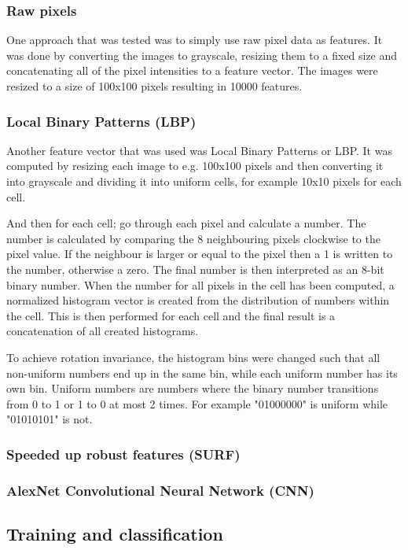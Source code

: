 \documentclass[doc/report.tex]{subfiles}
\begin{document}
\subsubsection{Raw pixels}
One approach that was tested was to simply use raw pixel data as features. It
was done by converting the images to grayscale, resizing them to a fixed size
and concatenating all of the pixel intensities to a feature vector. The images
were resized to a size of 100x100 pixels resulting in 10000 features.

\subsubsection{Local Binary Patterns (LBP)}
Another feature vector that was used was Local Binary Patterns or LBP. It was
computed by resizing each image to e.g. 100x100 pixels and then converting it
into grayscale and dividing it into uniform cells, for example 10x10 pixels for
each cell.

And then for each cell; go through each pixel and calculate a number. The
number is calculated by comparing the 8 neighbouring pixels clockwise to the
pixel value. If the neighbour is larger or equal to the pixel then a 1 is
written to the number, otherwise a zero. The final number is then interpreted
as an 8-bit binary number. When the number for all pixels in the cell has been
computed, a normalized histogram vector is created from the distribution of
numbers within the cell. This is then performed for each cell and the final
result is a concatenation of all created histograms.

To achieve rotation invariance, the histogram bins were changed such that all
non-uniform numbers end up in the same bin, while each uniform number has its
own bin. Uniform numbers are numbers where the binary number transitions from 0
to 1 or 1 to 0 at most 2 times. For example "01000000" is uniform while
"01010101" is not.

\subsubsection{Speeded up robust features (SURF)}

\subsubsection{AlexNet Convolutional Neural Network (CNN)}


\subsection{Training and classification}
\end{document}

